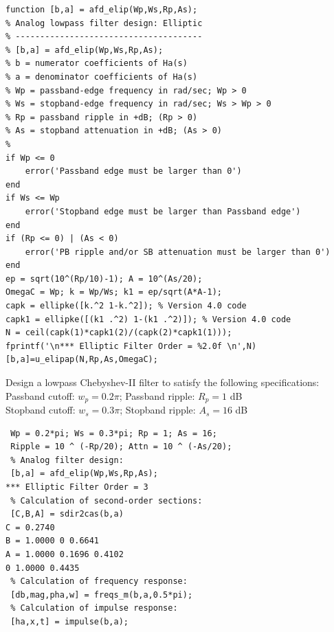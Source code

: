 \documentclass{article}
\begin{document}
\begin{lstlisting}
function [b,a] = afd_elip(Wp,Ws,Rp,As);
% Analog lowpass filter design: Elliptic
% --------------------------------------
% [b,a] = afd_elip(Wp,Ws,Rp,As);
% b = numerator coefficients of Ha(s)
% a = denominator coefficients of Ha(s)
% Wp = passband-edge frequency in rad/sec; Wp > 0
% Ws = stopband-edge frequency in rad/sec; Ws > Wp > 0
% Rp = passband ripple in +dB; (Rp > 0)
% As = stopband attenuation in +dB; (As > 0)
%
if Wp <= 0
    error('Passband edge must be larger than 0')
end
if Ws <= Wp
    error('Stopband edge must be larger than Passband edge')
end
if (Rp <= 0) | (As < 0)
    error('PB ripple and/or SB attenuation must be larger than 0')
end
ep = sqrt(10^(Rp/10)-1); A = 10^(As/20);
OmegaC = Wp; k = Wp/Ws; k1 = ep/sqrt(A*A-1);
capk = ellipke([k.^2 1-k.^2]); % Version 4.0 code
capk1 = ellipke([(k1 .^2) 1-(k1 .^2)]); % Version 4.0 code
N = ceil(capk(1)*capk1(2)/(capk(2)*capk1(1)));
fprintf('\n*** Elliptic Filter Order = %2.0f \n',N)
[b,a]=u_elipap(N,Rp,As,OmegaC);
\end{lstlisting}

Design a lowpass Chebyshev-II filter to satisfy the following specifications: \\
\vspace{1em}
Passband cutoff: $w_p=0.2\pi$; Passband ripple: $R_p=1$ dB \\
\vspace{1em}
Stopband cutoff: $w_s=0.3\pi$; Stopband ripple: $A_s =16$ dB \\
\vspace{1em}
\begin{lstlisting}
 Wp = 0.2*pi; Ws = 0.3*pi; Rp = 1; As = 16;
 Ripple = 10 ^ (-Rp/20); Attn = 10 ^ (-As/20);
 % Analog filter design:
 [b,a] = afd_elip(Wp,Ws,Rp,As);
*** Elliptic Filter Order = 3
 % Calculation of second-order sections:
 [C,B,A] = sdir2cas(b,a)
C = 0.2740
B = 1.0000 0 0.6641
A = 1.0000 0.1696 0.4102
0 1.0000 0.4435
 % Calculation of frequency response:
 [db,mag,pha,w] = freqs_m(b,a,0.5*pi);
 % Calculation of impulse response:
 [ha,x,t] = impulse(b,a);    
\end{lstlisting}
\end{document}
